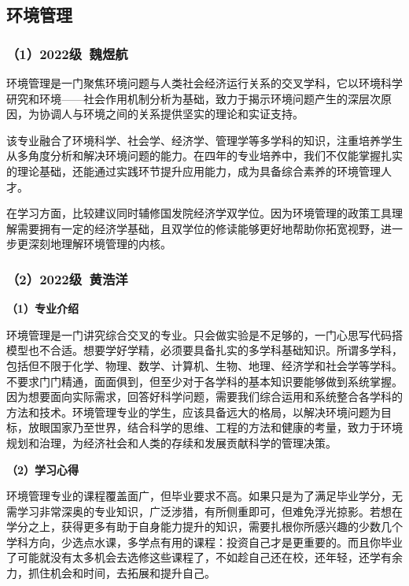 \documentclass[11pt,oneside]{book}
\begin{document}
\subsection{环境管理}

\subsubsection{（1）2022级\ 魏煜航}

环境管理是一门聚焦环境问题与人类社会经济运行关系的交叉学科，它以环境科学研究和环境——社会作用机制分析为基础，致力于揭示环境问题产生的深层次原因，为协调人与环境之间的关系提供坚实的理论和实证支持。

\vspace{10pt}

该专业融合了环境科学、社会学、经济学、管理学等多学科的知识，注重培养学生从多角度分析和解决环境问题的能力。在四年的专业培养中，我们不仅能掌握扎实的理论基础，还能通过实践环节提升应用能力，成为具备综合素养的环境管理人才。

\vspace{10pt}

在学习方面，比较建议同时辅修国发院经济学双学位。因为环境管理的政策工具理解需要拥有一定的经济学基础，且双学位的修读能够更好地帮助你拓宽视野，进一步更深刻地理解环境管理的内核。

\subsubsection{（2）2022级\ 黄浩洋}

\textbf{（1）专业介绍}

环境管理是一门讲究综合交叉的专业。只会做实验是不足够的，一门心思写代码搭模型也不合适。想要学好学精，必须要具备扎实的多学科基础知识。所谓多学科，包括但不限于化学、物理、数学、计算机、生物、地理、经济学和社会学等学科。不要求门门精通，面面俱到，但至少对于各学科的基本知识要能够做到系统掌握。因为想要面向实际需求，回答好科学问题，需要我们综合运用和系统整合各学科的方法和技术。环境管理专业的学生，应该具备远大的格局，以解决环境问题为目标，放眼国家乃至世界，结合科学的思维、工程的方法和健康的考量，致力于环境规划和治理，为经济社会和人类的存续和发展贡献科学的管理决策。

\vspace{10pt}

\textbf{（2）学习心得}

环境管理专业的课程覆盖面广，但毕业要求不高。如果只是为了满足毕业学分，无需学习非常深奥的专业知识，广泛涉猎，有所侧重即可，但难免浮光掠影。若想在学分之上，获得更多有助于自身能力提升的知识，需要扎根你所感兴趣的少数几个学科方向，少选点水课，多学点有用的课程：投资自己才是更重要的。而且你毕业了可能就没有太多机会去选修这些课程了，不如趁自己还在校，还年轻，还学有余力，抓住机会和时间，去拓展和提升自己。
\end{document}
